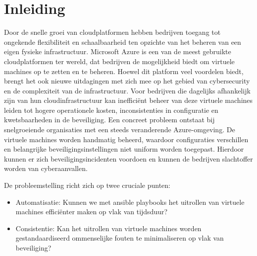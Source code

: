


% 

\section{Inleiding}%
\label{sec:inleiding}

Door de snelle groei van cloudplatformen hebben bedrijven toegang tot ongekende flexibiliteit en schaalbaarheid ten opzichte van het beheren van een eigen fysieke infrastructuur.
Microsoft Azure is een van de meest gebruikte cloudplatformen ter wereld, dat bedrijven de mogelijkheid biedt om virtuele machines op te zetten en te beheren.
Hoewel dit platform veel voordelen biedt, brengt het ook nieuwe uitdagingen met zich mee op het gebied van cybersecurity en de complexiteit van de infrastructuur.
Voor bedrijven die dagelijks afhankelijk zijn van hun cloudinfrastructuur kan inefficiënt beheer van deze virtuele machines leiden tot hogere operationele kosten, inconsistenties in configuratie en kwetsbaarheden in de beveiliging.
Een concreet probleem ontstaat bij snelgroeiende organisaties met een steeds veranderende Azure-omgeving.
De virtuele machines worden handmatig beheerd, waardoor configuraties verschillen en belangrijke beveiligingsinstellingen niet uniform worden toegepast.
Hierdoor kunnen er zich beveiligingsincidenten voordoen en kunnen de bedrijven slachtoffer worden van cyberaanvallen.

De probleemstelling richt zich op twee cruciale punten:

\begin{itemize}
  \item Automatisatie: Kunnen we met ansible playbooks het uitrollen van virtuele machines efficiënter maken op vlak van tijdsduur?
  \item Consistentie: Kan het uitrollen van virtuele machines worden gestandaardiseerd om\linebreak menselijke fouten te minimaliseren op vlak van beveiliging?
\end{itemize}

